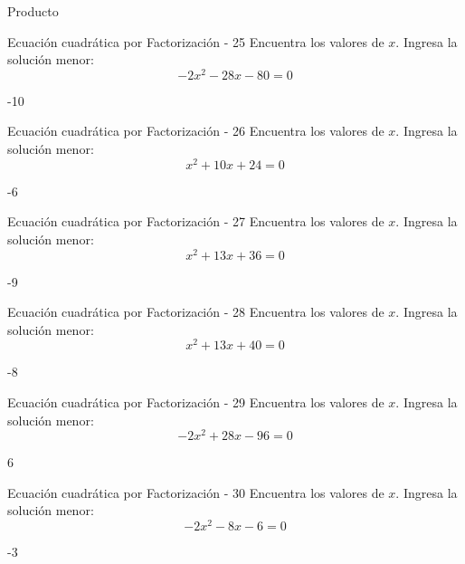 \documentclass[a4,11pt]{aleph-notas}
\begin{document}
\begin{quiz}{Producto}
\begin{numerical}[]%
    {Ecuación cuadrática por Factorización - 25}
    Encuentra los valores de $x$. Ingresa la solución menor:
    \[
        - 2 x^{2} - 28 x - 80 = 0
    \]
    \item[] -10
\end{numerical}

\begin{numerical}[]%
    {Ecuación cuadrática por Factorización - 26}
    Encuentra los valores de $x$. Ingresa la solución menor:
    \[
        x^{2} + 10 x + 24 = 0
    \]
    \item[] -6
\end{numerical}

\begin{numerical}[]%
    {Ecuación cuadrática por Factorización - 27}
    Encuentra los valores de $x$. Ingresa la solución menor:
    \[
        x^{2} + 13 x + 36 = 0
    \]
    \item[] -9
\end{numerical}

\begin{numerical}[]%
    {Ecuación cuadrática por Factorización - 28}
    Encuentra los valores de $x$. Ingresa la solución menor:
    \[
        x^{2} + 13 x + 40 = 0
    \]
    \item[] -8
\end{numerical}

\begin{numerical}[]%
    {Ecuación cuadrática por Factorización - 29}
    Encuentra los valores de $x$. Ingresa la solución menor:
    \[
        - 2 x^{2} + 28 x - 96 = 0
    \]
    \item[] 6
\end{numerical}

\begin{numerical}[]%
    {Ecuación cuadrática por Factorización - 30}
    Encuentra los valores de $x$. Ingresa la solución menor:
    \[
        - 2 x^{2} - 8 x - 6 = 0
    \]
    \item[] -3
\end{numerical}


\end{quiz}
\end{document}
